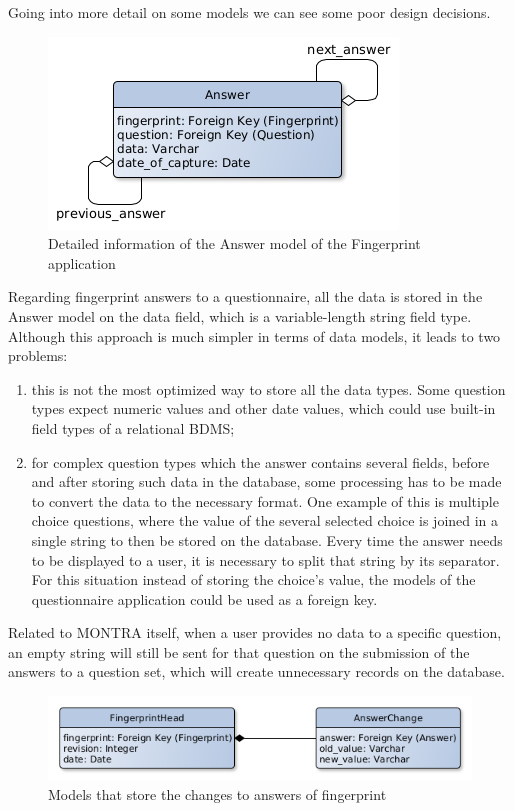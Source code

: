 
Going into more detail on some models we can see some poor design decisions.

\begin{figure}[H]
    \center
    \includegraphics[width=.4\linewidth]{answer-model}
    \caption{Detailed information of the Answer model of the Fingerprint application}
    \label{fig:answer-model}
\end{figure}

Regarding fingerprint answers to a questionnaire, all the data is stored in the Answer model on the data field, which is a variable-length string field type.
Although this approach is much simpler in terms of data models, it leads to two problems:
\begin{enumerate}
    \item this is not the most optimized way to store all the data types.
        Some question types expect numeric values and other date values, which could use built-in field types of a relational BDMS;
    \item for complex question types which the answer contains several fields, before and after storing such data in the database, some processing has to be made to convert the data to the necessary format.
        One example of this is multiple choice questions, where the value of the several selected choice is joined in a single string to then be stored on the database.
        Every time the answer needs to be displayed to a user, it is necessary to split that string by its separator.
        For this situation instead of storing the choice's value, the models of the questionnaire application could be used as a foreign key.
\end{enumerate}

Related to MONTRA itself, when a user provides no data to a specific question, an empty string will still be sent for that question on the submission of the answers to a question set, which will create unnecessary records on the database.

\begin{figure}[H]
    \center
    \includegraphics[width=.6\linewidth]{answer-changes-models}
    \caption{Models that store the changes to answers of fingerprint}
    \label{fig:answer-changes-models}
\end{figure}

